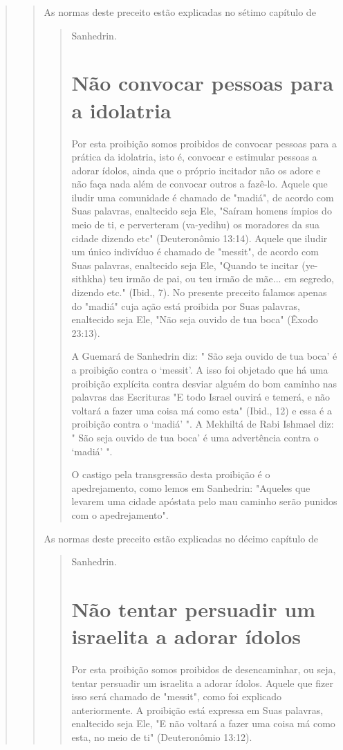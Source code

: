 \begin{quote}
\begin{quote}
As normas deste preceito estão explicadas no sétimo capítulo de

\begin{quote}
Sanhedrin.

\section{Não convocar pessoas para a idolatria}

Por esta proibição somos proibidos de convocar pessoas para a práti­ca
da idolatria, isto é, convocar e estimular pessoas a adorar ídolos,
ainda que o próprio incitador não os adore e não faça nada além de
convocar outros a fazê-lo. Aquele que iludir uma comunidade é chamado de
"madiá", de acordo com Suas palavras, enaltecido seja Ele, "Saíram
homens ímpios do meio de ti, e per­verteram (va-yedihu) os moradores da
sua cidade dizendo etc" (Deuteronômio 13:14). Aquele que iludir um único
indivíduo é chamado de "messit", de acordo com Suas palavras, enaltecido
seja Ele, "Quando te incitar (ye-sithkha) teu irmão de pai, ou teu irmão
de mãe... em segredo, dizendo etc." (Ibid., 7). No presente preceito
falamos apenas do "madiá" cuja ação está proibida por Suas palavras,
enaltecido seja Ele, "Não seja ouvido de tua boca" (Êxodo 23:13).

A Guemará de Sanhedrin diz: " São seja ouvido de tua boca' é a proibição
contra o `messit'. A isso foi objetado que há uma proibição explícita
contra desviar alguém do bom caminho nas palavras das Escrituras "E todo
Is­rael ouvirá e temerá, e não voltará a fazer uma coisa má como esta"
(Ibid., 12) e essa é a proibição contra o `madiá' ". A Mekhiltá de Rabi
Ishmael diz: " São seja ouvido de tua boca' é uma advertência contra o
`madiá' ".

O castigo pela transgressão desta proibição é o apedrejamento, co­mo
lemos em Sanhedrin: "Aqueles que levarem uma cidade apóstata pelo mau
caminho serão punidos com o apedrejamento".
\end{quote}

As normas deste preceito estão explicadas no décimo capítulo de

\begin{quote}
Sanhedrin.

\section{Não tentar persuadir um israelita a adorar ídolos}

Por esta proibição somos proibidos de desencaminhar, ou seja, ten­tar
persuadir um israelita a adorar ídolos. Aquele que fizer isso será
chamado de "messit", como foi explicado anteriormente. A proibição está
expressa em Suas palavras, enaltecido seja Ele, "E não voltará a fazer
uma coisa má como esta, no meio de ti" (Deuteronômio 13:12).


\end{quote}
\end{quote}
\end{quote}
